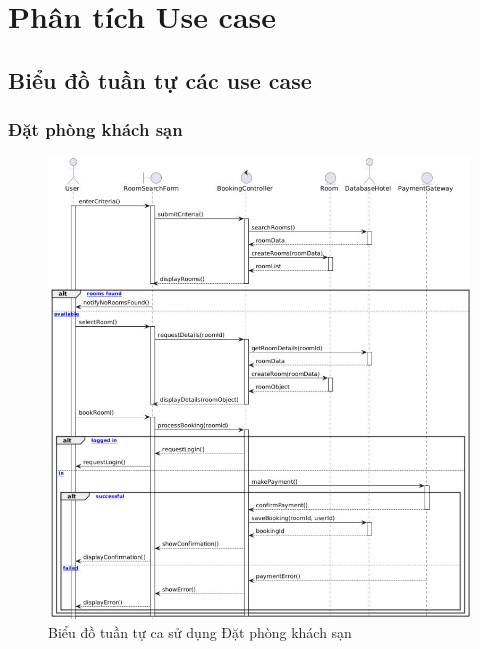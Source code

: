 \section{Phân tích Use case}
\subsection{Biểu đồ tuần tự các use case}
\subsubsection{Đặt phòng khách sạn}
\begin{figure}[H]
    \centering
    \includegraphics[width=\textwidth]{img2/timthue.jpg}
    \caption{Biểu đồ tuần tự ca sử dụng Đặt phòng khách sạn}
\end{figure}

